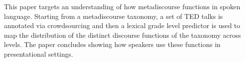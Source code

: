 This paper targets an understanding of how metadiscourse functions in spoken language. Starting from a metadiscourse taxonomy, a set of TED talks is annotated via crowdsourcing and then a lexical grade level predictor is used to map the distribution of the distinct discourse functions of the taxonomy across levels. The paper concludes showing how speakers use these functions in presentational settings.
